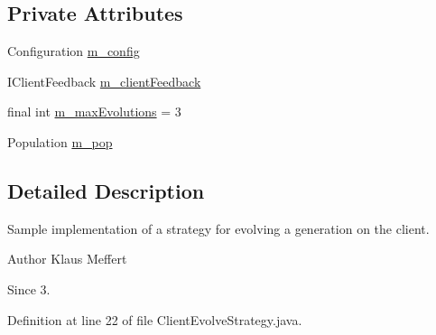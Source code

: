 \subsection*{Private Attributes}
\begin{DoxyCompactItemize}
\item 
Configuration \hyperlink{classexamples_1_1grid_1_1evolution_distributed_1_1_client_evolve_strategy_a74d6e70dcb6fff747a2d0b90c9dbc499}{m\-\_\-config}
\item 
I\-Client\-Feedback \hyperlink{classexamples_1_1grid_1_1evolution_distributed_1_1_client_evolve_strategy_a38aab9f20be2019017d7f3dfed47fd2e}{m\-\_\-client\-Feedback}
\item 
final int \hyperlink{classexamples_1_1grid_1_1evolution_distributed_1_1_client_evolve_strategy_a0bafd8b0667b17e11a333f89afa24a96}{m\-\_\-max\-Evolutions} = 3
\item 
Population \hyperlink{classexamples_1_1grid_1_1evolution_distributed_1_1_client_evolve_strategy_aaa3ff06ee06818aa8240564231e03e64}{m\-\_\-pop}
\end{DoxyCompactItemize}


\subsection{Detailed Description}
Sample implementation of a strategy for evolving a generation on the client.

\begin{DoxyAuthor}{Author}
Klaus Meffert 
\end{DoxyAuthor}
\begin{DoxySince}{Since}
3. 
\end{DoxySince}


Definition at line 22 of file Client\-Evolve\-Strategy.\-java.



